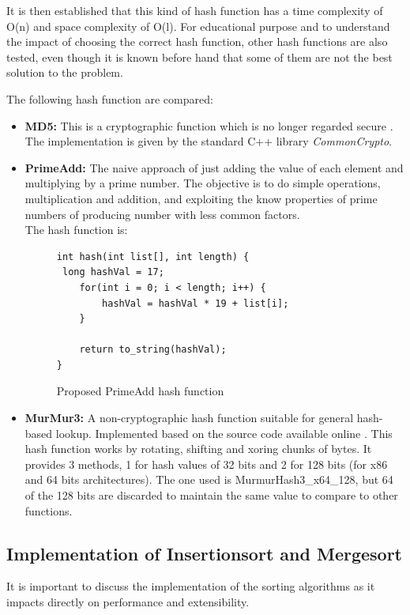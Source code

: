 \documentclass[a4paper,12pt]{article}
\begin{document}
It is then established that this kind of hash function has a time complexity of O(n) and space complexity of O(l). For educational purpose and to understand the impact of choosing the correct hash function, other hash functions are also tested, even though it is known before hand that some of them are not the best solution to the problem.

The following hash function are compared:

\begin{itemize}

\item {\bf MD5:} This is a cryptographic function \cite{rivest1992md5} which is no longer regarded secure \cite{wang2005break}.  The implementation is given by the standard C++ library {\it CommonCrypto}.

\item {\bf PrimeAdd:} The naive approach of just adding the value of each element and multiplying by a prime number. The objective is to do simple operations, multiplication and addition, and exploiting the know properties of prime numbers of producing number with less common factors. \\ 
The hash function is:

\begin{figure}[H]
\begin{verbatim}
int hash(int list[], int length) {
 long hashVal = 17;
    for(int i = 0; i < length; i++) {
        hashVal = hashVal * 19 + list[i];
    }

    return to_string(hashVal);
}
\end{verbatim}
\caption{Proposed PrimeAdd hash function}
\end{figure}
 

\item {\bf MurMur3:} A non-cryptographic hash function suitable for general hash-based lookup. Implemented based on the source code available online \cite{MurMur3}. This hash function works by rotating, shifting and xoring chunks of bytes. It provides 3 methods, 1 for hash values of 32 bits and 2 for 128 bits (for x86 and 64 bits architectures). The one used is MurmurHash3\_x64\_128, but 64 of the 128 bits are discarded to maintain the same value to compare to other functions.

\end{itemize}

\subsection{Implementation of Insertionsort and Mergesort} \label{SortingImplementation}
It is important to discuss the implementation of the sorting algorithms as it impacts directly on performance and extensibility.
\end{document}
